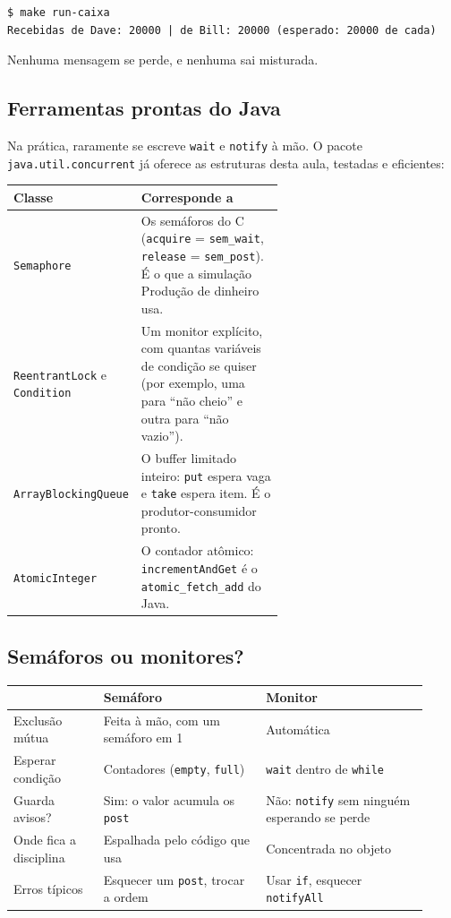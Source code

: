 \documentclass[11pt,a4paper]{article}
\newcommand{\cmd}[1]{\texttt{#1}}
\begin{document}
\begin{lstlisting}[style=terminal]
$ make run-caixa
Recebidas de Dave: 20000 | de Bill: 20000 (esperado: 20000 de cada)
\end{lstlisting}

Nenhuma mensagem se perde, e nenhuma sai misturada.

\subsection{Ferramentas prontas do Java}

Na prática, raramente se escreve \cmd{wait} e \cmd{notify} à mão. O pacote \cmd{java.util.concurrent} já oferece as estruturas desta aula, testadas e eficientes:

\begin{center}
\begin{tabular}{@{}lR{0.6\linewidth}@{}}
\toprule
\textbf{Classe} & \textbf{Corresponde a} \\
\midrule
\cmd{Semaphore} & Os semáforos do C (\cmd{acquire} = \cmd{sem\_wait}, \cmd{release} = \cmd{sem\_post}). É o que a simulação Produção de dinheiro usa. \\
\cmd{ReentrantLock} e \cmd{Condition} & Um monitor explícito, com quantas variáveis de condição se quiser (por exemplo, uma para ``não cheio'' e outra para ``não vazio''). \\
\cmd{ArrayBlockingQueue} & O buffer limitado inteiro: \cmd{put} espera vaga e \cmd{take} espera item. É o produtor-consumidor pronto. \\
\cmd{AtomicInteger} & O contador atômico: \cmd{incrementAndGet} é o \cmd{atomic\_fetch\_add} do Java. \\
\bottomrule
\end{tabular}
\end{center}

\subsection{Semáforos ou monitores?}

\begin{center}
\begin{tabular}{@{}R{0.2\linewidth}R{0.36\linewidth}R{0.36\linewidth}@{}}
\toprule
& \textbf{Semáforo} & \textbf{Monitor} \\
\midrule
Exclusão mútua & Feita à mão, com um semáforo em 1 & Automática \\
Esperar condição & Contadores (\cmd{empty}, \cmd{full}) & \cmd{wait} dentro de \cmd{while} \\
Guarda avisos? & Sim: o valor acumula os \cmd{post} & Não: \cmd{notify} sem ninguém esperando se perde \\
Onde fica a disciplina & Espalhada pelo código que usa & Concentrada no objeto \\
Erros típicos & Esquecer um \cmd{post}, trocar a ordem & Usar \cmd{if}, esquecer \cmd{notifyAll} \\
\bottomrule
\end{tabular}
\end{center}
\end{document}
